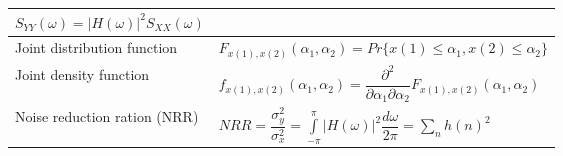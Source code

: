 \begin{tabularx}{\linewidth}{|l|X|}
  $S_{YY}(\omega) = |H(\omega)|^2 S_{XX}(\omega)$
	\\ \hline
	Joint distribution function &
	$ F_{x(1),x(2)} (\alpha_1 , \alpha _2) = Pr\{ x(1) \leq \alpha _1 , x(2) \leq \alpha _2 \} $
	\\ \hline
	Joint density function &
	$ f_{x(1), x(2)} (\alpha _1, \alpha _2) = \dfrac{\partial^2}{\partial \alpha _1 \partial \alpha _2} F_{x(1),x(2)} 
	(\alpha_1 , \alpha_2) $
	\\ \hline
	Noise reduction ration (NRR) &
	$NRR = \dfrac{\sigma_y^2}{\sigma_x^2} = \int\limits_{-\pi}^\pi |H(\omega)|^2 \dfrac{d\omega}{2\pi}
	= \sum\limits_{n} h(n)^2$
	\\ \hline
\end{tabularx}